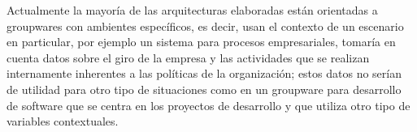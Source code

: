 Actualmente la mayor\'ia de las arquitecturas elaboradas est\'an orientadas a groupwares con ambientes espec\'ificos, es decir, usan el contexto de un escenario en particular, por ejemplo un sistema para  procesos empresariales, tomar\'ia en cuenta datos sobre el giro de la empresa y las actividades que se realizan internamente inherentes a las pol\'iticas de la organizaci\'on; estos datos no ser\'ian de utilidad para otro tipo de situaciones como en un groupware para desarrollo de software que se centra en los proyectos de desarrollo y que utiliza otro tipo de variables contextuales.
